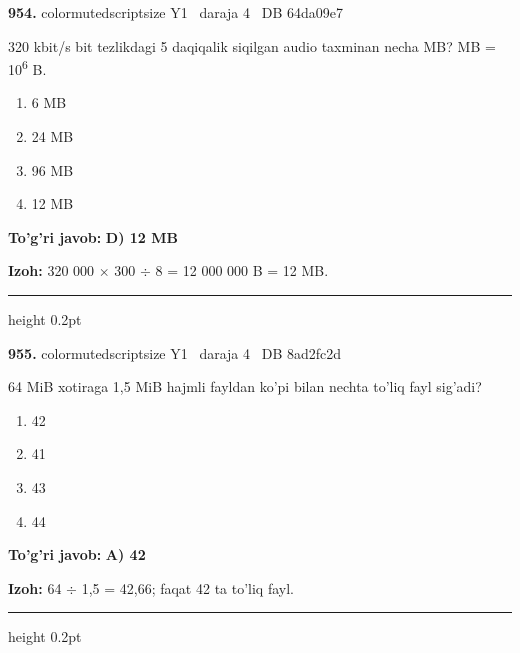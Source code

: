 \documentclass[10pt,a4paper,oneside]{article}
\begin{document}
\noindent\textbf{\color{ink}954.}  {color{muted}scriptsize Y1 \textbullet\ daraja 4 \textbullet\ DB 64da09e7}
\par
320 kbit/s bit tezlikdagi 5 daqiqalik siqilgan audio taxminan necha MB? MB = 10\textsuperscript{6} B.
\begin{enumerate}[label=\Alph*),leftmargin=9mm]
\item 6 MB
\item 24 MB
\item 96 MB
\item 12 MB
\end{enumerate}
\begin{tcolorbox}[enhanced,breakable,colback=teal!4,colframe=teal!50!black,boxrule=0.5pt,arc=1.1mm,left=3mm,right=3mm,top=1.7mm,bottom=1.7mm,before skip=2mm,after skip=2mm]
\textbf{\color{teal}To'g'ri javob:} \textbf{D) 12 MB}
\par\smallskip
\textbf{Izoh:} 320 000 \ensuremath{\times} 300 \ensuremath{\div} 8 = 12 000 000 B = 12 MB.
\end{tcolorbox}
\vspace{2mm}\hrule height 0.2pt \vspace{3mm}

\noindent\textbf{\color{ink}955.}  {color{muted}scriptsize Y1 \textbullet\ daraja 4 \textbullet\ DB 8ad2fc2d}
\par
64 MiB xotiraga 1,5 MiB hajmli fayldan ko'pi bilan nechta to'liq fayl sig'adi?
\begin{enumerate}[label=\Alph*),leftmargin=9mm]
\item 42
\item 41
\item 43
\item 44
\end{enumerate}
\begin{tcolorbox}[enhanced,breakable,colback=teal!4,colframe=teal!50!black,boxrule=0.5pt,arc=1.1mm,left=3mm,right=3mm,top=1.7mm,bottom=1.7mm,before skip=2mm,after skip=2mm]
\textbf{\color{teal}To'g'ri javob:} \textbf{A) 42}
\par\smallskip
\textbf{Izoh:} 64 \ensuremath{\div} 1,5 = 42,66; faqat 42 ta to'liq fayl.
\end{tcolorbox}
\vspace{2mm}\hrule height 0.2pt \vspace{3mm}
\end{document}

